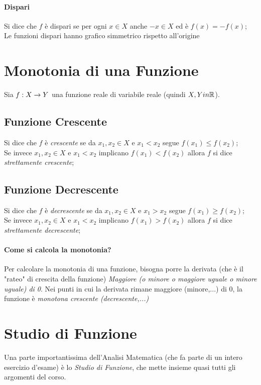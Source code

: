 \documentclass[12pt, a4paper, openany]{book}
\begin{document}
\paragraph*{Dispari}
Si dice che $f$ è dispari se per ogni $x \in X$ anche $-x \in X$ ed è $f(x) = -f(x)$;
\\Le funzioni dispari hanno grafico simmetrico rispetto all'origine

\section{Monotonia di una Funzione}
Sia $f: X \rightarrow Y$ una funzione reale di variabile reale (quindi $X, Y in \mathbb{R}$).

\subsection*{Funzione Crescente}
Si dice che $f$ è \emph{crescente} se da $x_1, x_2 \in X$ e $x_1 < x_2$ segue $f(x_1) \leq f(x_2)$;
\\Se invece $x_1, x_2 \in X$ e $x_1 < x_2$ implicano $f(x_1) < f(x_2)$ allora $f$ si dice \emph{strettamente crescente};

\subsection*{Funzione Decrescente}
Si dice che $f$ è \emph{decrescente} se da $x_1, x_2 \in X$ e $x_1 > x_2$ segue $f(x_1) \geq f(x_2)$;
\\Se invece $x_1, x_2 \in X$ e $x_1 < x_2$ implicano $f(x_1) > f(x_2)$ allora $f$ si dice \emph{strettamente decrescente};

\paragraph{Come si calcola la monotonia?}
Per calcolare la monotonia di una funzione, bisogna porre la derivata (che è il "rateo" di crescita della funzione) \emph{Maggiore (o minore o maggiore uguale o minore uguale) di 0}.
Nei punti in cui la derivata rimane maggiore (minore,...) di 0, la funzione è \emph{monotona crescente (decrescente,...)}


\section{Studio di Funzione}
Una parte importantissima dell'Analisi Matematica (che fa parte di un intero esercizio d'esame) è lo \emph{Studio di Funzione},
che mette insieme quasi tutti gli argomenti del corso.
\end{document}
